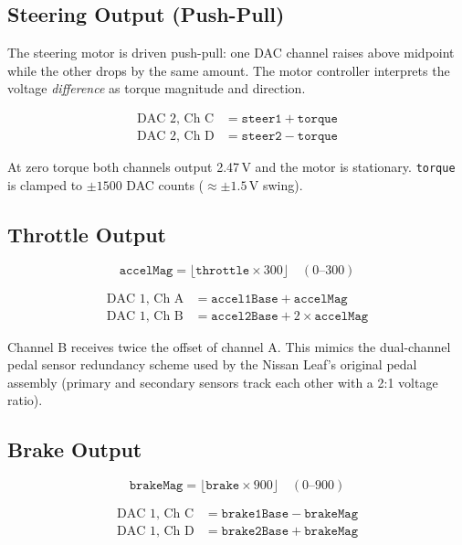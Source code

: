 \documentclass[12pt, letterpaper]{article}
\begin{document}
\subsection{Steering Output (Push-Pull)}

The steering motor is driven push-pull: one DAC channel raises above midpoint while
the other drops by the same amount.  The motor controller interprets the voltage
\emph{difference} as torque magnitude and direction.

\begin{align*}
  \text{DAC 2, Ch C} &= \texttt{steer1} + \texttt{torque} \\
  \text{DAC 2, Ch D} &= \texttt{steer2} - \texttt{torque}
\end{align*}

At zero torque both channels output 2.47\,V and the motor is stationary.
\texttt{torque} is clamped to $\pm1500$ DAC counts ($\approx\pm1.5$\,V swing).

\subsection{Throttle Output}

\[
  \texttt{accelMag} = \lfloor\texttt{throttle} \times 300\rfloor \quad (0\text{--}300)
\]

\begin{align*}
  \text{DAC 1, Ch A} &= \texttt{accel1Base} + \texttt{accelMag} \\
  \text{DAC 1, Ch B} &= \texttt{accel2Base} + 2 \times \texttt{accelMag}
\end{align*}

Channel B receives twice the offset of channel A.  This mimics the dual-channel
pedal sensor redundancy scheme used by the Nissan Leaf's original pedal assembly
(primary and secondary sensors track each other with a 2:1 voltage ratio).

\subsection{Brake Output}

\[
  \texttt{brakeMag} = \lfloor\texttt{brake} \times 900\rfloor \quad (0\text{--}900)
\]

\begin{align*}
  \text{DAC 1, Ch C} &= \texttt{brake1Base} - \texttt{brakeMag} \\
  \text{DAC 1, Ch D} &= \texttt{brake2Base} + \texttt{brakeMag}
\end{align*}
\end{document}
